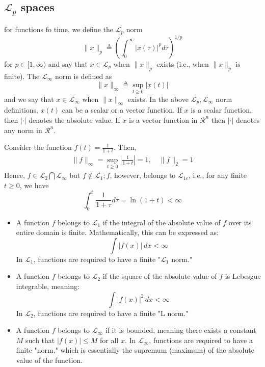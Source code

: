 \documentclass{article}
\begin{document}
\subsection{$\mathcal{L}_p$ spaces}
for functions fo time, we define the $\mathcal{L}_p$ norm
\begin{equation*}
	\|x\|_p \triangleq\left(\int_0^{\infty}|x(\tau)|^p d \tau\right)^{1 / p}
\end{equation*}
for $p \in[1, \infty)$ and say that $x \in \mathcal{L}_p$ when $\|x\|_p$ exists (i.e., when $\|x\|_p$ is finite). The $\mathcal{L}_{\infty}$ norm is defined as
$$
	\|x\|_{\infty} \triangleq \sup _{t \geq 0}|x(t)|
$$
and we say that $x \in \mathcal{L}_{\infty}$ when $\|x\|_{\infty}$ exists.
In the above $\mathcal{L}_p, \mathcal{L}_{\infty}$ norm definitions, $x(t)$ can be a scalar or a vector function. If $x$ is a scalar function, then $|\cdot|$ denotes the absolute value. If $x$ is a vector function in $\mathcal{R}^n$ then $|\cdot|$ denotes any norm in $\mathcal{R}^n$.
\begin{frm-ex}
Consider the function $f(t)=\frac{1}{1+t}$. Then,
$$
	\begin{gathered}
		\|f\|_{\infty}=\sup _{t \geq 0}\left|\frac{1}{1+t}\right|=1, \quad\|f\|_2=1
	\end{gathered}
$$
Hence, $f \in \mathcal{L}_2 \bigcap \mathcal{L}_{\infty}$ but $f \notin \mathcal{L}_1 ; f$, however, belongs to $\mathcal{L}_{1 e}$, i.e., for any finite $t \geq 0$, we have
$$
	\int_0^t \frac{1}{1+\tau} d \tau=\ln (1+t)<\infty
$$
\end{frm-ex}
\begin{itemize}
	\item A function $f$ belongs to $\mathcal{L}_1$ if the integral of the absolute value of $f$ over its entire domain is finite. Mathematically, this can be expressed as:
	      \[ \int |f(x)| \, dx < \infty \]
	      In $\mathcal{L}_1$, functions are required to have a finite "$\mathcal{L}_1$  norm."
	\item  A function $f$ belongs to $\mathcal{L}_2$ if the square of the absolute value of $f$ is Lebesgue integrable, meaning:
	      \[ \int |f(x)|^2 \, dx < \infty \]
	      In $\mathcal{L}_2$, functions are required to have a finite "L norm."
	\item A function $f$ belongs to $\mathcal{L}_\infty$ if it is bounded, meaning there exists a constant $M$ such that $|f(x)| \leq M$ for all $x$. In $\mathcal{L}_\infty$, functions are required to have a finite "norm," which is essentially the supremum (maximum) of the absolute value of the function.
\end{itemize}
\end{document}
